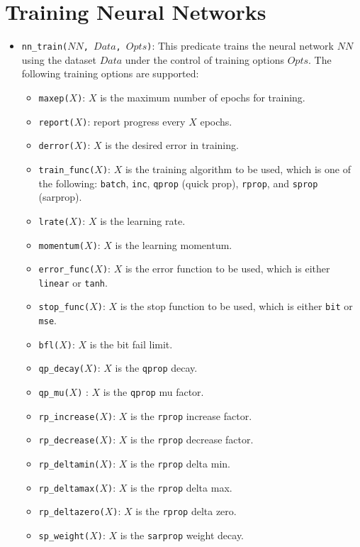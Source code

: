 \section{Training Neural Networks}
\begin{itemize}
\item \texttt{nn\_train($NN$, $Data$, $Opts$)}: This predicate trains the neural network $NN$ using the dataset $Data$ under the control of training options $Opts$. The following training options are supported:
\begin{itemize}
\item \texttt{maxep($X$)}: $X$ is the maximum number of epochs for training.
\item \texttt{report($X$)}:	report progress every $X$ epochs. 
\item \texttt{derror($X$)}:	$X$ is the desired error in training.
\item \texttt{train\_func($X$)}: $X$ is the training algorithm to be used, which is one of the following: \texttt{batch}, \texttt{inc}, \texttt{qprop} (quick prop), \texttt{rprop}, and \texttt{sprop} (sarprop).
\item \texttt{lrate($X$)}: $X$ is the learning rate.
\item \texttt{momentum($X$)}: $X$ is the learning momentum.
\item \texttt{error\_func($X$)}: $X$ is the error function to be used, which is either \texttt{linear} or \texttt{tanh}.
\item \texttt{stop\_func($X$)}:	$X$ is the stop function to be used, which is either \texttt{bit} or \texttt{mse}.
\item \texttt{bfl($X$)}:  $X$ is the bit fail limit.
\item \texttt{qp\_decay($X$)}:	 $X$ is the \texttt{qprop} decay.
\item \texttt{qp\_mu($X$)} : $X$ is the \texttt{qprop}  mu factor.
\item \texttt{rp\_increase($X$)}:	$X$ is the \texttt{rprop} increase factor.
\item \texttt{rp\_decrease($X$)}: $X$ is the \texttt{rprop} decrease factor.
\item \texttt{rp\_deltamin($X$)}: $X$ is the \texttt{rprop} delta min.
\item \texttt{rp\_deltamax($X$)}: $X$ is the \texttt{rprop} delta max.
\item \texttt{rp\_deltazero($X$)}: $X$ is the \texttt{rprop} delta zero.
\item \texttt{sp\_weight($X$)}:	$X$ is the \texttt{sarprop} weight decay.

\end{itemize}
\end{itemize}
